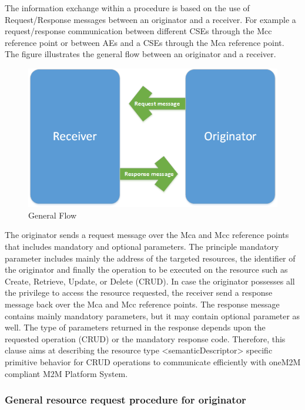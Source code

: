 The information exchange within a procedure is based on the use of Request/Response messages between an originator and a receiver. For example a request/response communication between different CSEs through the Mcc reference point or between AEs and a CSEs through the Mca reference point. The figure illustrates the general flow between an originator and a receiver.\par
\begin{figure}[htbp]
    \centering
    \includegraphics[width=.6\textwidth]{resources/images/response-request}
    \caption{General Flow }\label{fig:contrib1:goal}
\end{figure}
The originator sends a request message over the Mca and Mcc reference points that includes mandatory and optional parameters. The principle mandatory parameter includes mainly the address of the targeted resources, the identifier of the originator and finally the operation to be executed on the resource such as Create, Retrieve, Update, or Delete (CRUD). In case the originator possesses all the privilege to access the resource requested, the receiver send a response message back over the Mca and Mcc reference points. The response message contains mainly mandatory parameters, but it may contain optional parameter as well. The type of parameters returned in the response depends upon the requested operation (CRUD) or the mandatory response code. Therefore, this clause aims at describing the resource type <semanticDescriptor> specific primitive behavior for CRUD operations to communicate efficiently with oneM2M compliant M2M Platform System.\par

\subsubsection*{General resource request procedure for originator }

